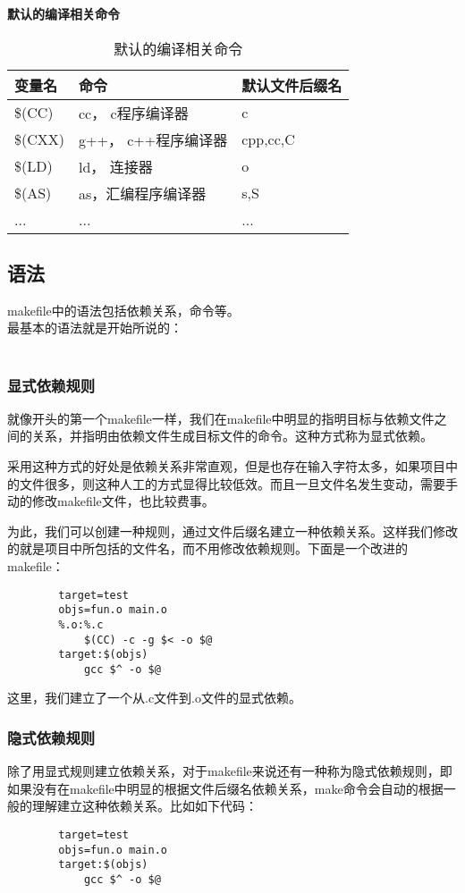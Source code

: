 \documentclass{article}
\begin{document}
\begin{CJK}{UTF8}{gbsn}
	\textbf{默认的编译相关命令}\\
	\begin{table}[!htp]
	\begin{tabular}{l|l|l}
		\hline
		变量名 & 命令 & 默认文件后缀名\\
		\hline
		\$(CC) & cc， c程序编译器 & c\\
		\hline
		\$(CXX) & g++， c++程序编译器 & cpp,cc,C\\
		\hline
		\$(LD) & ld， 连接器 & o\\
		\hline
		\$(AS) & as，汇编程序编译器 & s,S\\
		\hline
		... & ... & ...\\
		\hline
	\end{tabular}
		\caption{默认的编译相关命令}
	\end{table}
	\subsection{语法}
	makefile中的语法包括依赖关系，命令等。\\
	最基本的语法就是开始所说的：\\
	\\
	\subsubsection{显式依赖规则}
	就像开头的第一个makefile一样，我们在makefile中明显的指明目标与依赖文件之间的关系，并指明由依赖文件生成目标文件的命令。这种方式称为显式依赖。\par
	采用这种方式的好处是依赖关系非常直观，但是也存在输入字符太多，如果项目中的文件很多，则这种人工的方式显得比较低效。而且一旦文件名发生变动，需要手动的修改makefile文件，也比较费事。\par
	为此，我们可以创建一种规则，通过文件后缀名建立一种依赖关系。这样我们修改的就是项目中所包括的文件名，而不用修改依赖规则。下面是一个改进的makefile：\par
	\begin{verbatim}
		target=test
		objs=fun.o main.o
		%.o:%.c
		    $(CC) -c -g $< -o $@
		target:$(objs)
			gcc $^ -o $@ 
	\end{verbatim}
		这里，我们建立了一个从.c文件到.o文件的显式依赖。
	\subsubsection{隐式依赖规则}
	除了用显式规则建立依赖关系，对于makefile来说还有一种称为隐式依赖规则，即如果没有在makefile中明显的根据文件后缀名依赖关系，make命令会自动的根据一般的理解建立这种依赖关系。比如如下代码：\par
	\begin{verbatim}
		target=test
		objs=fun.o main.o
		target:$(objs)
			gcc $^ -o $@
	\end{verbatim}



\end{CJK}
\end{document}
